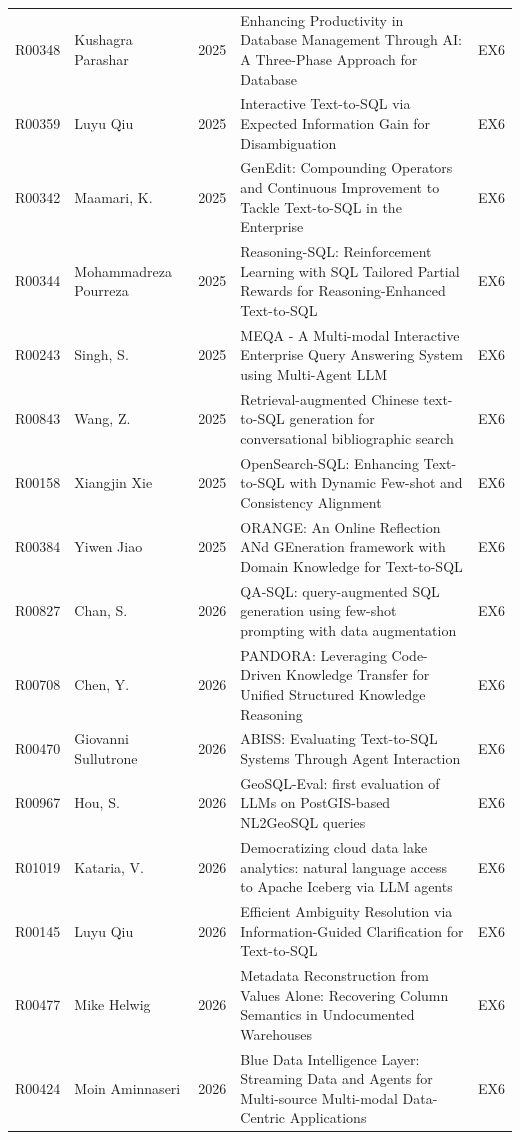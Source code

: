 {\begin{longtable}{@{}l p{3.0cm} l p{11.2cm} l@{}}
R00348 & Kushagra Parashar & 2025 & Enhancing Productivity in Database Management Through AI: A Three-Phase Approach for Database & EX6 \\
R00359 & Luyu Qiu & 2025 & Interactive Text-to-SQL via Expected Information Gain for Disambiguation & EX6 \\
R00342 & Maamari, K. & 2025 & GenEdit: Compounding Operators and Continuous Improvement to Tackle Text-to-SQL in the Enterprise & EX6 \\
R00344 & Mohammadreza Pourreza & 2025 & Reasoning-SQL: Reinforcement Learning with SQL Tailored Partial Rewards for Reasoning-Enhanced Text-to-SQL & EX6 \\
R00243 & Singh, S. & 2025 & MEQA - A Multi-modal Interactive Enterprise Query Answering System using Multi-Agent LLM & EX6 \\
R00843 & Wang, Z. & 2025 & Retrieval-augmented Chinese text-to-SQL generation for conversational bibliographic search & EX6 \\
R00158 & Xiangjin Xie & 2025 & OpenSearch-SQL: Enhancing Text-to-SQL with Dynamic Few-shot and Consistency Alignment & EX6 \\
R00384 & Yiwen Jiao & 2025 & ORANGE: An Online Reflection ANd GEneration framework with Domain Knowledge for Text-to-SQL & EX6 \\
R00827 & Chan, S. & 2026 & QA-SQL: query-augmented SQL generation using few-shot prompting with data augmentation & EX6 \\
R00708 & Chen, Y. & 2026 & PANDORA: Leveraging Code-Driven Knowledge Transfer for Unified Structured Knowledge Reasoning & EX6 \\
R00470 & Giovanni Sullutrone & 2026 & ABISS: Evaluating Text-to-SQL Systems Through Agent Interaction & EX6 \\
R00967 & Hou, S. & 2026 & GeoSQL-Eval: first evaluation of LLMs on PostGIS-based NL2GeoSQL queries & EX6 \\
R01019 & Kataria, V. & 2026 & Democratizing cloud data lake analytics: natural language access to Apache Iceberg via LLM agents & EX6 \\
R00145 & Luyu Qiu & 2026 & Efficient Ambiguity Resolution via Information-Guided Clarification for Text-to-SQL & EX6 \\
R00477 & Mike Helwig & 2026 & Metadata Reconstruction from Values Alone: Recovering Column Semantics in Undocumented Warehouses & EX6 \\
R00424 & Moin Aminnaseri & 2026 & Blue Data Intelligence Layer: Streaming Data and Agents for Multi-source Multi-modal Data-Centric Applications & EX6 \\

\end{longtable}}
